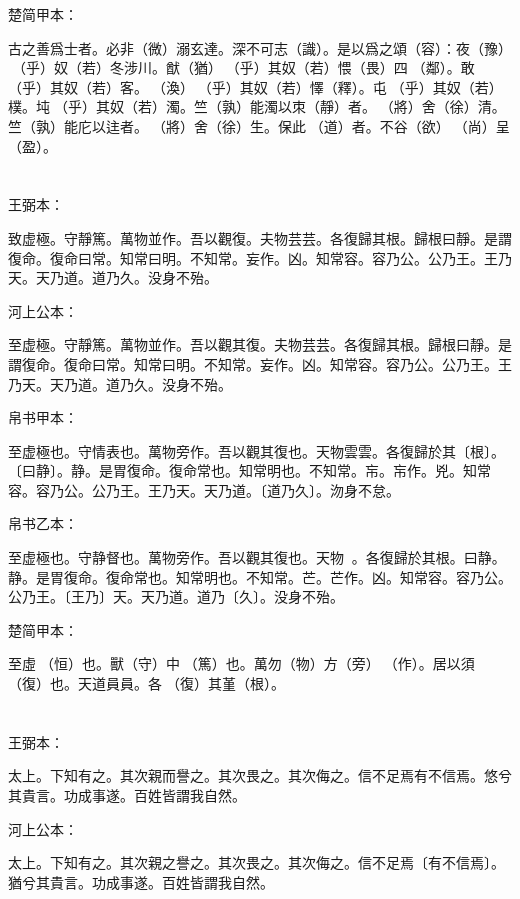 \documentclass[a5paper]{ctexbook}
\begin{document}
    楚简甲本：

    古之善爲士者。必非（微）溺玄達。深不可志（識）。是以爲之頌（容）：夜（豫）󶴋（乎）奴（若）冬涉川。猷（猶）󶴋（乎）其奴（若）愄（畏）四𠳵（鄰）。敢󶴋（乎）其奴（若）客。󶴝（渙）󶴋（乎）其奴（若）懌（釋）。屯󶴋（乎）其奴（若）樸。坉󶴋（乎）其奴（若）濁。竺（孰）能濁以朿（靜）者。𨟻（將）舍（徐）清。竺（孰）能庀以迬者。𨟻（將）舍（徐）生。保此𧗟（道）者。不谷（欲）󶴞（尚）呈（盈）。

    \chapter{}
    王弼本：

    致虚極。守靜篤。萬物並作。吾以觀復。夫物芸芸。各復歸其根。歸根曰靜。是謂復命。復命曰常。知常曰明。不知常。妄作。凶。知常容。容乃公。公乃王。王乃天。天乃道。道乃久。没身不殆。

    河上公本：

    至虚極。守靜篤。萬物並作。吾以觀其復。夫物芸芸。各復歸其根。歸根曰靜。是謂復命。復命曰常。知常曰明。不知常。妄作。凶。知常容。容乃公。公乃王。王乃天。天乃道。道乃久。没身不殆。

    帛书甲本：

    至虚極也。守情表也。萬物旁作。吾以觀其復也。天物雲雲。各復歸於其〔根〕。〔曰静〕。静。是胃復命。復命常也。知常明也。不知常。㠵。㠵作。兇。知常容。容乃公。公乃王。王乃天。天乃道。〔道乃久〕。沕身不怠。

    帛书乙本：

    至虚極也。守静督也。萬物旁作。吾以觀其復也。天物𥘟𥘟。各復歸於其根。曰静。静。是胃復命。復命常也。知常明也。不知常。芒。芒作。凶。知常容。容乃公。公乃王。〔王乃〕天。天乃道。道乃〔久〕。没身不殆。

    楚简甲本：

    至虛𠄨（恒）也。獸（守）中󶴮（篤）也。萬勿（物）方（旁）󶴮（作）。居以須󵯿（復）也。天道員員。各󵯿（復）其堇（根）。

    \chapter{}
    王弼本：

    太上。下知有之。其次親而譽之。其次畏之。其次侮之。信不足焉有不信焉。悠兮其貴言。功成事遂。百姓皆謂我自然。

    河上公本：

    太上。下知有之。其次親之譽之。其次畏之。其次侮之。信不足焉〔有不信焉〕。猶兮其貴言。功成事遂。百姓皆謂我自然。
\end{document}
